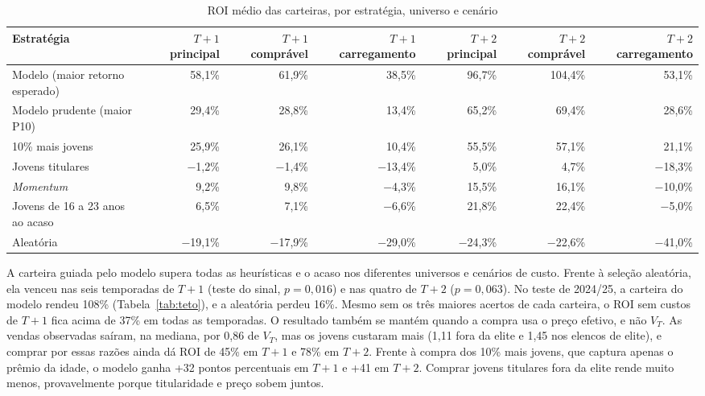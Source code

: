 \documentclass[article, 12pt, oneside, a4paper, english, brazil, section=TITLE]{abntex2}
\begin{document}
\begin{table}[htbp]
  \caption{ROI médio das carteiras, por estratégia, universo e cenário}
  \label{tab:backtest}
  \begin{tabularx}{\textwidth}{Lrrrrrr}
    \toprule
    Estratégia & $T+1$ principal & $T+1$ comprável & $T+1$ carregamento & $T+2$ principal & $T+2$ comprável & $T+2$ carregamento \\
    \midrule
    Modelo (maior retorno esperado) & 58,1\% & 61,9\% & 38,5\% & 96,7\% & 104,4\% & 53,1\% \\
    Modelo prudente (maior P10) & 29,4\% & 28,8\% & 13,4\% & 65,2\% & 69,4\% & 28,6\% \\
    10\% mais jovens & 25,9\% & 26,1\% & 10,4\% & 55,5\% & 57,1\% & 21,1\% \\
    Jovens titulares & −1,2\% & −1,4\% & −13,4\% & 5,0\% & 4,7\% & −18,3\% \\
    \textit{Momentum} & 9,2\% & 9,8\% & −4,3\% & 15,5\% & 16,1\% & −10,0\% \\
    Jovens de 16 a 23 anos ao acaso & 6,5\% & 7,1\% & −6,6\% & 21,8\% & 22,4\% & −5,0\% \\
    Aleatória & −19,1\% & −17,9\% & −29,0\% & −24,3\% & −22,6\% & −41,0\% \\
    \bottomrule
  \end{tabularx}
\end{table}

A carteira guiada pelo modelo supera todas as heurísticas e o acaso nos diferentes universos e cenários de custo.
Frente à seleção aleatória, ela venceu nas seis temporadas de $T+1$ (teste do sinal, $p = 0{,}016$) e nas quatro de $T+2$ ($p = 0{,}063$).
No teste de 2024/25, a carteira do modelo rendeu 108\% (Tabela~\ref{tab:teto}), e a aleatória perdeu 16\%.
Mesmo sem os três maiores acertos de cada carteira, o ROI sem custos de $T+1$ fica acima de 37\% em todas as temporadas.
O resultado também se mantém quando a compra usa o preço efetivo, e não $V_T$.
As vendas observadas saíram, na mediana, por 0,86 de $V_T$, mas os jovens custaram mais (1,11 fora da elite e 1,45 nos elencos de elite), e comprar por essas razões ainda dá ROI de 45\% em $T+1$ e 78\% em $T+2$.
Frente à compra dos 10\% mais jovens, que captura apenas o prêmio da idade, o modelo ganha +32 pontos percentuais em $T+1$ e +41 em $T+2$.
Comprar jovens titulares fora da elite rende muito menos, provavelmente porque titularidade e preço sobem juntos.
\end{document}
